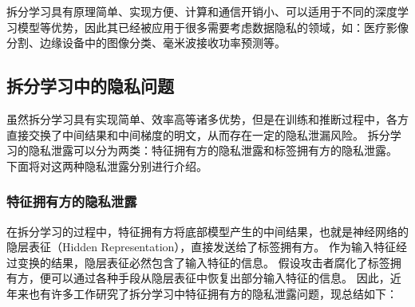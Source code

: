 拆分学习具有原理简单、实现方便、计算和通信开销小、可以适用于不同的深度学习模型等优势，因此其已经被应用于很多需要考虑数据隐私的领域，如：医疗影像分割\cite{roth2022split_unet}、边缘设备中的图像分类\cite{fagbohungbe2022split_edge_image,palanisamy2021spliteasy}、毫米波接收功率预测\cite{koda2020split_mmwave}等。

\subsection{拆分学习中的隐私问题}
虽然拆分学习具有实现简单、效率高等诸多优势，但是在训练和推断过程中，各方直接交换了中间结果和中间梯度的明文，从而存在一定的隐私泄漏风险。
%
拆分学习的隐私泄露可以分为两类：特征拥有方的隐私泄露和标签拥有方的隐私泄露。
%
下面将对这两种隐私泄露分别进行介绍。
%
\subsubsection{特征拥有方的隐私泄露}
在拆分学习的过程中，特征拥有方将底部模型产生的中间结果，也就是神经网络的隐层表征（Hidden Representation），直接发送给了标签拥有方。
%
作为输入特征经过变换的结果，隐层表征必然包含了输入特征的信息。
%
假设攻击者腐化了标签拥有方，便可以通过各种手段从隐层表征中恢复出部分输入特征的信息。
因此，近年来也有许多工作研究了拆分学习中特征拥有方的隐私泄露问题，现总结如下：
%
